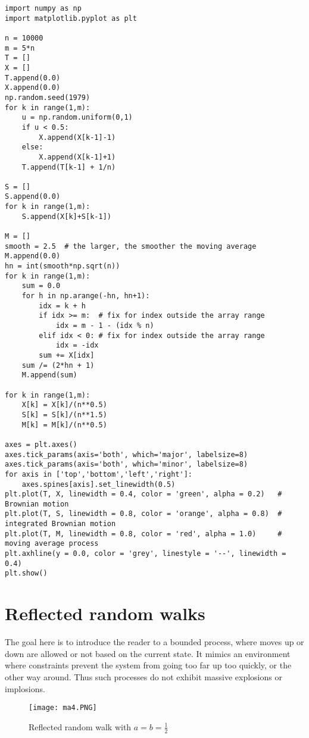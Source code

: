 \documentclass[oneside,10pt]{book}
\begin{document}
\begin{lstlisting}
import numpy as np
import matplotlib.pyplot as plt

n = 10000
m = 5*n
T = []
X = []
T.append(0.0)
X.append(0.0)
np.random.seed(1979)
for k in range(1,m):
    u = np.random.uniform(0,1)
    if u < 0.5:
        X.append(X[k-1]-1)
    else:
        X.append(X[k-1]+1)
    T.append(T[k-1] + 1/n)

S = []
S.append(0.0)
for k in range(1,m):
    S.append(X[k]+S[k-1])

M = []
smooth = 2.5  # the larger, the smoother the moving average
M.append(0.0)
hn = int(smooth*np.sqrt(n))
for k in range(1,m):
    sum = 0.0
    for h in np.arange(-hn, hn+1):
        idx = k + h
        if idx >= m:  # fix for index outside the array range
            idx = m - 1 - (idx % n)
        elif idx < 0: # fix for index outside the array range
            idx = -idx
        sum += X[idx]
    sum /= (2*hn + 1)
    M.append(sum)

for k in range(1,m):
    X[k] = X[k]/(n**0.5)
    S[k] = S[k]/(n**1.5)
    M[k] = M[k]/(n**0.5)

axes = plt.axes()
axes.tick_params(axis='both', which='major', labelsize=8)
axes.tick_params(axis='both', which='minor', labelsize=8)
for axis in ['top','bottom','left','right']:
    axes.spines[axis].set_linewidth(0.5)
plt.plot(T, X, linewidth = 0.4, color = 'green', alpha = 0.2)   # Brownian motion
plt.plot(T, S, linewidth = 0.8, color = 'orange', alpha = 0.8)  # integrated Brownian motion
plt.plot(T, M, linewidth = 0.8, color = 'red', alpha = 1.0)     # moving average process
plt.axhline(y = 0.0, color = 'grey', linestyle = '--', linewidth = 0.4)
plt.show()
\end{lstlisting}

\section{Reflected random walks}\label{rflectr}

The goal here is to introduce the reader to a bounded process, where moves up or down are allowed or not based on the current state. It mimics an environment where constraints prevent the system from going too far up too quickly, or the other way around. Thus such processes do not exhibit massive explosions or implosions.

\begin{figure}%
\centering
\texttt{[image: ma4.PNG]} %
\caption{Reflected random walk with $a=b=\frac{1}{2}$}
\label{fig:ivf}
\end{figure}
\end{document}
